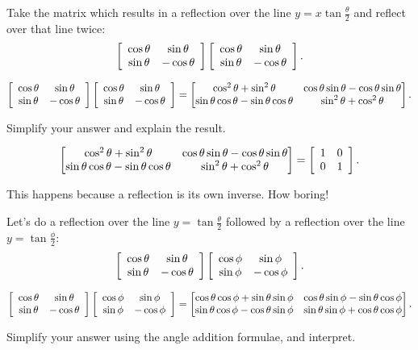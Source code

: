 \documentclass[../key.tex]{subfiles}
\begin{document}
\begin{inner_problem}[start=1]
\item Take the matrix which results in a reflection over the line $y=x\tan \frac{\theta}{2}$ and reflect over that line twice: $$\left[\begin{array}{cc} \cos\theta & \sin\theta \\ \sin\theta & -\cos\theta \end{array}\right]\left[\begin{array}{cc} \cos\theta & \sin\theta \\ \sin\theta & -\cos\theta \end{array}\right].$$
\end{inner_problem}

$$\left[\begin{array}{cc} \cos\theta & \sin\theta \\ \sin\theta & -\cos\theta \end{array}\right]\left[\begin{array}{cc} \cos\theta & \sin\theta \\ \sin\theta & -\cos\theta \end{array}\right] = \begin{bmatrix} \cos^2\theta + \sin^2\theta & \cos\theta\sin\theta-\cos\theta\sin\theta \\ \sin\theta\cos\theta - \sin\theta\cos\theta & \sin^2\theta + \cos^2\theta\end{bmatrix}.$$

\begin{inner_problem}
\item Simplify your answer and explain the result.
\end{inner_problem}

$$\begin{bmatrix} \cos^2\theta + \sin^2\theta & \cos\theta\sin\theta-\cos\theta\sin\theta \\ \sin\theta\cos\theta - \sin\theta\cos\theta & \sin^2\theta + \cos^2\theta\end{bmatrix} = \left[\begin{array}{cc} 1 & 0 \\ 0 & 1 \end{array}\right].$$

This happens because a reflection is its own inverse. How boring!

\begin{inner_problem}
\item Let's do a reflection over the line $y=\tan\frac{\theta}{2}$ followed by a reflection over the line $y=\tan\frac{\phi}{2}$:
$$\left[\begin{array}{cc} \cos\theta & \sin\theta \\ \sin\theta & -\cos\theta \end{array}\right]\left[\begin{array}{cc} \cos\phi & \sin\phi \\ \sin\phi & -\cos\phi \end{array}\right].$$
\end{inner_problem}

$$\left[\begin{array}{cc} \cos\theta & \sin\theta \\ \sin\theta & -\cos\theta \end{array}\right]\left[\begin{array}{cc} \cos\phi & \sin\phi \\ \sin\phi & -\cos\phi \end{array}\right] = \begin{bmatrix}
\cos\theta\cos\phi + \sin\theta\sin\phi & \cos\theta\sin\phi-\sin\theta\cos\phi \\ \sin\theta\cos\phi-\cos\theta\sin\phi & \sin\theta\sin\phi + \cos\theta\cos\phi
\end{bmatrix}.$$

\begin{inner_problem}
\item Simplify your answer using the angle addition formulae, and interpret.
\end{inner_problem}
\end{document}
